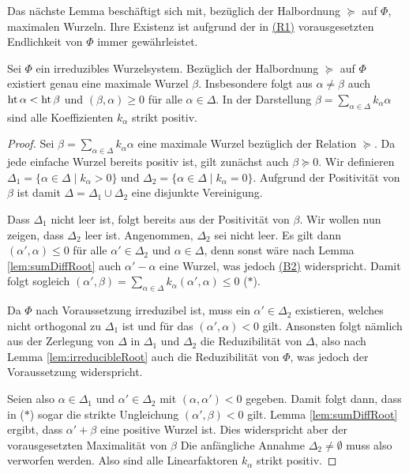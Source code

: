 Das nächste Lemma beschäftigt sich mit, bezüglich der Halbordnung $\succeq$ auf $\Phi$, maximalen Wurzeln. 
Ihre Existenz ist aufgrund der in \hyperref[it:R1]{(R1)} vorausgesetzten Endlichkeit von $\Phi$ immer gewährleistet. 

\begin{lem}
  \label{lem:maximalRoot}
  Sei $\Phi$ ein irreduzibles Wurzelsystem.
  Bezüglich der Halbordnung $\succeq$ auf $\Phi$ existiert genau eine maximale Wurzel $\beta$.
  Insbesondere folgt aus $\alpha \neq \beta$ auch $\operatorname{ht} \alpha < \operatorname{ht} \beta$ und $(\beta, \alpha) \geq 0$ für alle $\alpha \in \Delta$.
  In der Darstellung $\beta = \sum_{\alpha \in \Delta} k_\alpha \alpha$ sind alle Koeffizienten $k_\alpha$ strikt positiv.
\end{lem}

\begin{proof}
  Sei $\beta = \sum_{\alpha \in \Delta} k_\alpha \alpha$ eine maximale Wurzel bezüglich der Relation $\succeq$.
  Da jede einfache Wurzel bereits positiv ist, gilt zunächst auch $\beta \succeq 0$.
  Wir definieren $\Delta_1 = \{\alpha \in \Delta \mid k_\alpha > 0\}$ und $\Delta_2 = \{\alpha \in \Delta \mid k_\alpha = 0\}$.
  Aufgrund der Positivität von $\beta$ ist damit $\Delta = \Delta_1 \cup \Delta_2$ eine disjunkte Vereinigung.

  Dass $\Delta_1$ nicht leer ist, folgt bereits aus der Positivität von $\beta$.
  Wir wollen nun zeigen, dass $\Delta_2$ leer ist.
  Angenommen, $\Delta_2$ sei nicht leer.
  Es gilt dann $(\alpha', \alpha) \leq 0$ für alle $\alpha' \in \Delta_2$ und $\alpha \in \Delta$, denn sonst wäre nach Lemma \ref{lem:sumDiffRoot} auch $\alpha' - \alpha$ eine Wurzel, was jedoch \hyperref[it:B2]{(B2)} widerspricht.
  Damit folgt sogleich $(\alpha', \beta) = \sum_{\alpha \in \Delta} k_\alpha (\alpha', \alpha) \leq 0 $ ($\ast$).

  Da $\Phi$ nach Voraussetzung irreduzibel ist, muss ein $\alpha' \in \Delta_2$ existieren, welches nicht orthogonal zu $\Delta_1$ ist und für das $(\alpha', \alpha) < 0$ gilt.
  Ansonsten folgt nämlich aus der Zerlegung von $\Delta$ in $\Delta_1$ und $\Delta_2$ die Reduzibilität von $\Delta$, also nach Lemma \ref{lem:irreducibleRoot} auch die Reduzibilität von $\Phi$, was jedoch der Voraussetzung widerspricht.

  Seien also $\alpha \in \Delta_1$ und $\alpha' \in \Delta_2$ mit $(\alpha, \alpha') < 0$ gegeben.
  Damit folgt dann, dass in ($\ast$) sogar die strikte Ungleichung $(\alpha', \beta) < 0$ gilt.
  Lemma \ref{lem:sumDiffRoot} ergibt, dass $\alpha' +  \beta$ eine positive Wurzel ist.
  Dies widerspricht aber der vorausgesetzten Maximalität von $\beta$
  Die anfängliche Annahme $\Delta_2 \neq \emptyset$ muss also verworfen werden.
  Also sind alle Linearfaktoren $k_\alpha$ strikt positiv.


\end{proof}
